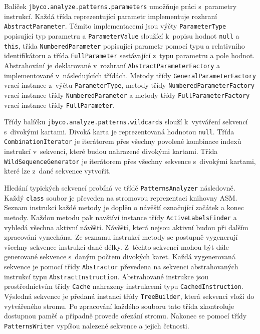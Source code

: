 Balíček \texttt{jbyco.analyze.patterns.parameters} umožňuje práci s~parametry instrukcí. Každá třída reprezentující parametr implementuje rozhraní \texttt{AbstractParameter}. Těmito implementacemi jsou výčty \texttt{ParameterType} popisující typ parametru a \texttt{ParameterValue} sloužící k~popisu hodnot \texttt{null} a \texttt{this}, třída \texttt{NumberedParameter} popisující parametr pomocí typu a relativního identifikátoru a třída \texttt{FullParameter} sestávající z~typu parametru a pole hodnot. Abstrahování je deklarované v~rozhraní \texttt{AbstractParameterFactory} a implementované v~následujících třídách. Metody třídy \texttt{GeneralParameterFactory} vrací instance z~výčtu \texttt{ParameterType}, metody třídy \texttt{NumberedParameterFactory} vrací instance třídy \texttt{NumberedParameter} a metody třídy \texttt{FullParameterFactory} vrací instance třídy \texttt{FullParameter}.

Třídy balíčku \texttt{jbyco.analyze.patterns.wildcards} slouží k~vytváření sekvencí s~divokými kartami. Divoká karta je reprezentovaná hodnotou \texttt{null}. Třída \texttt{CombinationIterator} je iterátorem přes všechny povolené kombinace indexů instrukcí v~sekvenci, které budou nahrazené divokými kartami. Třída \texttt{WildSequenceGenerator} je iterátorem přes všechny sekvence s~divokými kartami, které lze z~dané sekvence vytvořit.

Hledání typických sekvencí probíhá ve třídě \texttt{PatternsAnalyzer} následovně. Každý \texttt{class} soubor je převeden na stromovou reprezentaci knihovny ASM. Seznam instrukcí každé metody je doplěn o návěští označující začátek a konec metody. Každou metodu pak navštíví instance třídy \texttt{ActiveLabelsFinder} a vyhledá všechna aktivní návěští. Návěští, která nejsou aktivní budou při dalším zpracování vynechána. Ze seznamu instrukcí metody se postupně vygenerují všechny sekvence instrukcí dané délky. Z~těchto sekvencí mohou být dále generované sekvence s~daným počtem divokých karet. Každá vygenerovaná sekvence je pomocí třídy \texttt{Abstractor} převedena na sekvenci abstrahovaných instrukcí typu \texttt{AbstractInstruction}. Abstrahované instrukce jsou prostřednictvím třídy \texttt{Cache} nahrazeny instrukcemi typu \texttt{CachedInstruction}. Výsledná sekvence je předaná instanci třídy \texttt{TreeBuilder}, která sekvenci vloží do vytvářeného stromu. Po zpracování každého souboru tato třída zkontroluje dostupnou paměť a případně provede ořezání stromu. Nakonec se pomocí třídy \texttt{PatternsWriter} vypíšou nalezené sekvence a jejich četnosti.

